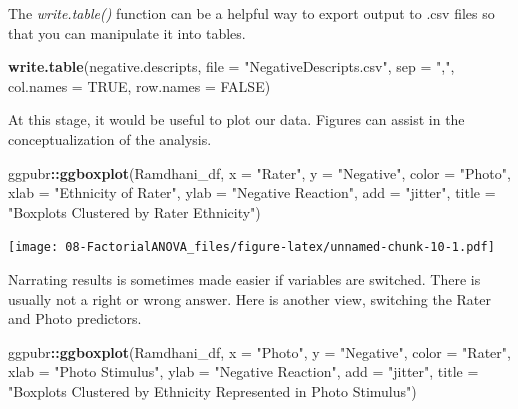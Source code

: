 \documentclass[
  11pt,
]{book}
\newenvironment{Shaded}{\begin{snugshade}}{\end{snugshade}}
\newcommand{\AttributeTok}[1]{\textcolor[rgb]{0.27,0.27,0.27}{#1}}
\newcommand{\ConstantTok}[1]{\textcolor[rgb]{0.37,0.37,0.37}{#1}}
\newcommand{\FunctionTok}[1]{\textcolor[rgb]{0.27,0.27,0.27}{\textbf{#1}}}
\newcommand{\NormalTok}[1]{#1}
\newcommand{\SpecialCharTok}[1]{\textcolor[rgb]{0.43,0.43,0.43}{\textbf{#1}}}
\newcommand{\StringTok}[1]{\textcolor[rgb]{0.5,0.5,0.5}{#1}}
\begin{document}
The \emph{write.table()} function can be a helpful way to export output to .csv files so that you can manipulate it into tables.

\begin{Shaded}
\begin{Highlighting}[]
\FunctionTok{write.table}\NormalTok{(negative.descripts, }\AttributeTok{file =} \StringTok{"NegativeDescripts.csv"}\NormalTok{, }\AttributeTok{sep =} \StringTok{","}\NormalTok{,}
    \AttributeTok{col.names =} \ConstantTok{TRUE}\NormalTok{, }\AttributeTok{row.names =} \ConstantTok{FALSE}\NormalTok{)}
\end{Highlighting}
\end{Shaded}

At this stage, it would be useful to plot our data. Figures can assist in the conceptualization of the analysis.

\begin{Shaded}
\begin{Highlighting}[]
\NormalTok{ggpubr}\SpecialCharTok{::}\FunctionTok{ggboxplot}\NormalTok{(Ramdhani\_df, }\AttributeTok{x =} \StringTok{"Rater"}\NormalTok{, }\AttributeTok{y =} \StringTok{"Negative"}\NormalTok{, }\AttributeTok{color =} \StringTok{"Photo"}\NormalTok{,}
    \AttributeTok{xlab =} \StringTok{"Ethnicity of Rater"}\NormalTok{, }\AttributeTok{ylab =} \StringTok{"Negative Reaction"}\NormalTok{, }\AttributeTok{add =} \StringTok{"jitter"}\NormalTok{,}
    \AttributeTok{title =} \StringTok{"Boxplots Clustered by Rater Ethnicity"}\NormalTok{)}
\end{Highlighting}
\end{Shaded}

\texttt{[image: 08-FactorialANOVA\_files/figure-latex/unnamed-chunk-10-1.pdf]}

Narrating results is sometimes made easier if variables are switched. There is usually not a right or wrong answer. Here is another view, switching the Rater and Photo predictors.

\begin{Shaded}
\begin{Highlighting}[]
\NormalTok{ggpubr}\SpecialCharTok{::}\FunctionTok{ggboxplot}\NormalTok{(Ramdhani\_df, }\AttributeTok{x =} \StringTok{"Photo"}\NormalTok{, }\AttributeTok{y =} \StringTok{"Negative"}\NormalTok{, }\AttributeTok{color =} \StringTok{"Rater"}\NormalTok{,}
    \AttributeTok{xlab =} \StringTok{"Photo Stimulus"}\NormalTok{, }\AttributeTok{ylab =} \StringTok{"Negative Reaction"}\NormalTok{, }\AttributeTok{add =} \StringTok{"jitter"}\NormalTok{,}
    \AttributeTok{title =} \StringTok{"Boxplots Clustered by Ethnicity Represented in Photo Stimulus"}\NormalTok{)}
\end{Highlighting}
\end{Shaded}
\end{document}
